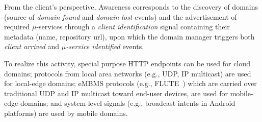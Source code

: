 
%	
%	

From the client's perspective, Awareness corresponds to the discovery of domains (source of \textit{domain found} and \textit{domain lost} events) and the advertisement of required $\mu$-services through a \textit{client identification} signal containing their metadata (name, repository url), upon which the domain manager triggers both \textit{client arrived} and \textit{$\mu$-service identified} events.%

To realize this activity, special purpose HTTP endpoints can be used for cloud domains; protocols from local area networks (e.g., UDP, IP multicast) are used for local-edge domains; eMBMS protocols (e.g., FLUTE~\cite{lecompte2012evolved}) which are carried over traditional UDP and IP multicast toward end-user devices, are used for mobile-edge domains; and system-level signals (e.g., broadcast intents in Android platforms) are used by mobile domains.



%
%	
%	

